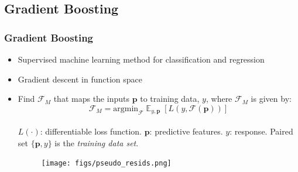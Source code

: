 \documentclass[t, pdftex]{beamer}
\DeclareMathOperator*{\E}{\mathbb{E}}
\begin{document}

\subsection*{Gradient Boosting}
\begin{frame}
\frametitle{Gradient Boosting}
\vspace{-8pt}
\begin{itemize}
    \item Supervised machine learning method for classification and regression
    \item Gradient descent in function space
    \item Find $\mathcal F_M$ that maps the inputs $\mathbf p$ to training data, $y$, where $\mathcal F_M$ is given by:
    \[
    \mathcal F_M = \text{argmin}_{\mathcal F} \E_{y, \mathbf p} [ L(y, \mathcal F(\mathbf p)) ]
    \]\\
    $L(\cdot)$: differentiable loss function.  $\mathbf p$: predictive features. $y$: response.  Paired set $\{\mathbf p, y \}$ is the \emph{training data set}.
\begin{figure}[!htbp]
    \centering
    \texttt{[image: figs/pseudo\_resids.png]}
    \label{model_overview}
\end{figure}
\end{itemize}
\cite{prett2014}
\end{frame}
\end{document}
